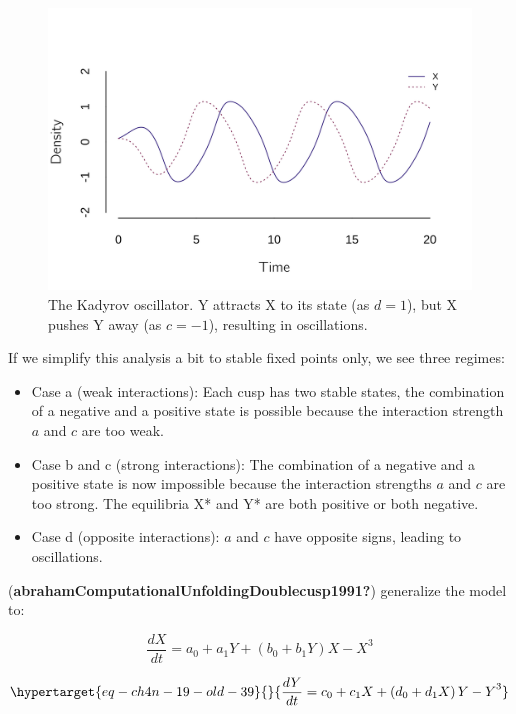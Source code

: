 \documentclass[
  a4paper,
  DIV=11,
  numbers=noendperiod]{scrreprt}
\begin{document}
\begin{figure}

{\centering \includegraphics{media/ch4n/fig-ch4n-img17-old-65.png}

}

\caption{\label{fig-ch4n-img17-old-65}The Kadyrov oscillator. Y attracts
X to its state (as \(d = 1\)), but X pushes Y away (as \(c = - 1\)),
resulting in oscillations.}

\end{figure}

If we simplify this analysis a bit to stable fixed points only, we see
three regimes:

\begin{itemize}
\item
  Case a (weak interactions): Each cusp has two stable states, the
  combination of a negative and a positive state is possible because the
  interaction strength \(a\) and \(c\) are too weak.
\item
  Case b and c (strong interactions): The combination of a negative and
  a positive state is now impossible because the interaction strengths
  \(a\) and \(c\) are too strong. The equilibria X* and Y* are both
  positive or both negative.
\item
  Case d (opposite interactions): \(a\) and \(c\) have opposite signs,
  leading to oscillations.
\end{itemize}

(\textbf{abrahamComputationalUnfoldingDoublecusp1991?}) generalize the
model to:

\[\frac{dX}{dt} = {a_{0} + a_{1}Y + (b_{0} + b_{1}Y)X - X}^{3}\]

\begin{equation}\protect\hypertarget{eq-ch4n-19-old-39}{}{
\frac{dY}{dt} = {c_{0} + c_{1}X + \left( d_{0} + d_{1}X \right)Y - Y}^{3}
}\label{eq-ch4n-19-old-39}\end{equation}
\end{document}
